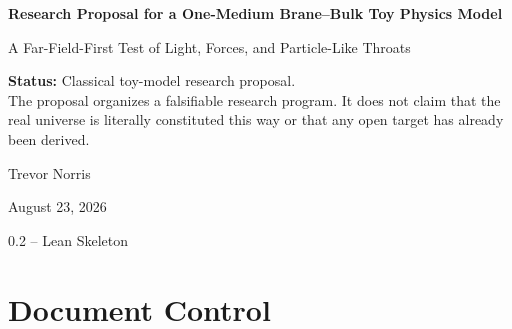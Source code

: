 \documentclass[11pt,oneside]{report}
\newcommand{\ProposalTitle}{Research Proposal for a One-Medium Brane--Bulk Toy Physics Model}
\newcommand{\ProposalSubtitle}{A Far-Field-First Test of Light, Forces, and Particle-Like Throats}
\newcommand{\ProposalAuthor}{Trevor Norris}
\newcommand{\ProposalVersion}{0.2 -- Lean Skeleton}
\newcommand{\ProposalDate}{August 23, 2026}
\begin{document}
\hypersetup{pageanchor=false}

\begin{titlepage}
  \centering
  \vspace*{1.0in}
  {\Huge\bfseries\color{ProposalBlue}\ProposalTitle\par}
  \vspace{0.45in}
  {\Large\color{ProposalGreen}\ProposalSubtitle\par}
  \vspace{0.75in}

  \begin{tcolorbox}[
    width=0.86\textwidth,
    colback=ProposalAmberLight,
    colframe=ProposalAmber,
    boxrule=0.8pt,
    arc=2mm]
  \centering
  \textbf{Status:} Classical toy-model research proposal.\\[0.35em]
  The proposal organizes a falsifiable research program. It does not claim that
  the real universe is literally constituted this way or that any open target
  has already been derived.
  \end{tcolorbox}

  \vfill
  {\large \ProposalAuthor\par}
  \vspace{0.2in}
  {\large \ProposalDate\par}
  \vspace{0.12in}
  {\large \ProposalVersion\par}
  \vspace*{0.6in}
\end{titlepage}

\hypersetup{pageanchor=true}

\chapter*{Document Control}
\end{document}
